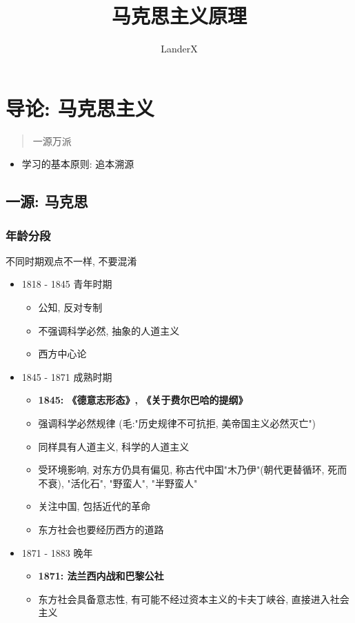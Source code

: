 \documentclass[11pt]{article}
\author{LanderX}
\date{}
\title{马克思主义原理}
\begin{document}
\maketitle
\tableofcontents


\section{导论: 马克思主义}
\label{sec:orgfe277d8}

\begin{quote}
一源万派
\end{quote}

\begin{itemize}
\item 学习的基本原则: 追本溯源
\end{itemize}

\subsection{一源: 马克思}
\label{sec:org538aea5}
\subsubsection{年龄分段}
\label{sec:org875625f}
不同时期观点不一样, 不要混淆

\begin{itemize}
\item 1818 - 1845 青年时期 
\begin{itemize}
\item 公知, 反对专制
\item 不强调科学必然, 抽象的人道主义
\item 西方中心论
\end{itemize}
\item 1845 - 1871 成熟时期
\begin{itemize}
\item \textbf{1845: 《德意志形态》, 《关于费尔巴哈的提纲》}
\item 强调科学必然规律 (毛:"历史规律不可抗拒, 美帝国主义必然灭亡")
\item 同样具有人道主义, 科学的人道主义
\item 受环境影响, 对东方仍具有偏见, 称古代中国"木乃伊"(朝代更替循环, 死而不衰), "活化石", "野蛮人", "半野蛮人"
\item 关注中国, 包括近代的革命
\item 东方社会也要经历西方的道路
\end{itemize}
\item 1871 - 1883 晚年
\begin{itemize}
\item \textbf{1871: 法兰西内战和巴黎公社}
\item 东方社会具备意志性, 有可能不经过资本主义的卡夫丁峡谷, 直接进入社会主义
\end{itemize}
\end{itemize}
\end{document}

